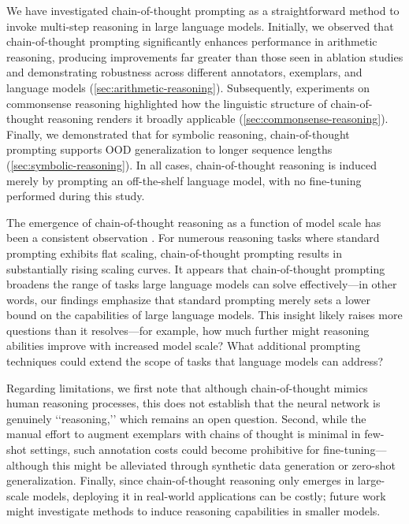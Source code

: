 We have investigated chain-of-thought prompting as a straightforward method to invoke multi-step reasoning in large language models. Initially, we observed that chain-of-thought prompting significantly enhances performance in arithmetic reasoning, producing improvements far greater than those seen in ablation studies and demonstrating robustness across different annotators, exemplars, and language models (\cref{sec:arithmetic-reasoning}). Subsequently, experiments on commonsense reasoning highlighted how the linguistic structure of chain-of-thought reasoning renders it broadly applicable (\cref{sec:commonsense-reasoning}). Finally, we demonstrated that for symbolic reasoning, chain-of-thought prompting supports OOD generalization to longer sequence lengths (\cref{sec:symbolic-reasoning}). In all cases, chain-of-thought reasoning is induced merely by prompting an off-the-shelf language model, with no fine-tuning performed during this study.

The emergence of chain-of-thought reasoning as a function of model scale has been a consistent observation \citep{wei2022emergent}. For numerous reasoning tasks where standard prompting exhibits flat scaling, chain-of-thought prompting results in substantially rising scaling curves. It appears that chain-of-thought prompting broadens the range of tasks large language models can solve effectively—in other words, our findings emphasize that standard prompting merely sets a lower bound on the capabilities of large language models. This insight likely raises more questions than it resolves—for example, how much further might reasoning abilities improve with increased model scale? What additional prompting techniques could extend the scope of tasks that language models can address?

Regarding limitations, we first note that although chain-of-thought mimics human reasoning processes, this does not establish that the neural network is genuinely ‘‘reasoning,’’ which remains an open question. Second, while the manual effort to augment exemplars with chains of thought is minimal in few-shot settings, such annotation costs could become prohibitive for fine-tuning—although this might be alleviated through synthetic data generation or zero-shot generalization.  Finally, since chain-of-thought reasoning only emerges in large-scale models, deploying it in real-world applications can be costly; future work might investigate methods to induce reasoning capabilities in smaller models.


